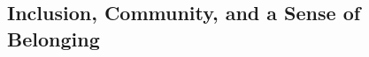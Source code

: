 \documentclass[../../../main.tex]{subfiles}
\begin{document}
\subsection{Inclusion, Community, and a Sense of Belonging}
\end{document}

